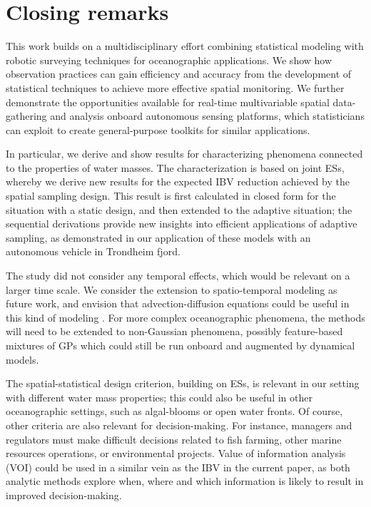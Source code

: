 \documentclass[aoas]{imsart}
\begin{document}

\section{Closing remarks}\label{sec:concl_disc}

This work builds on a multidisciplinary effort combining statistical
modeling with robotic surveying techniques for oceanographic
applications. We show how observation practices can gain efficiency
and accuracy from the development of statistical techniques to achieve
more effective spatial monitoring. We further demonstrate the
opportunities available for real-time multivariable spatial
data-gathering and analysis onboard autonomous sensing platforms,
which statisticians can exploit to create general-purpose toolkits for
similar applications.

In particular, we derive and show results for characterizing phenomena
connected to the properties of water masses. The characterization is
based on joint ESs, whereby we derive new results for the expected IBV
reduction achieved by the spatial sampling design. This result is
first calculated in closed form for the situation with a static
design, and then extended to the adaptive situation; the sequential
derivations provide new insights into efficient applications of
adaptive sampling, as demonstrated in our application of these models
with an autonomous vehicle in Trondheim fjord.

The study did not consider any temporal effects, which would be
relevant on a larger time scale. We consider the extension to
spatio-temporal modeling as future work, and envision that
advection-diffusion equations could be useful in this kind of modeling
\citep{sigrist2015stochastic}. For more complex oceanographic
phenomena, the methods will need to be extended to non-Gaussian
phenomena, possibly feature-based mixtures of GPs which could still be
run onboard and augmented by dynamical models.

The spatial-statistical design criterion, building on ESs, is relevant
in our setting with different water mass properties; this could also
be useful in other oceanographic settings, such as algal-blooms or
open water fronts. Of course, other criteria are also relevant for
decision-making.  For instance, managers and regulators must make
difficult decisions related to fish farming, other marine resources
operations, or environmental projects. Value of information analysis
(VOI) \citep{Eidsvik:15} could be used in a similar vein as the IBV in
the current paper, as both analytic methods explore when, where and
which information is likely to result in improved decision-making.
\end{document}
